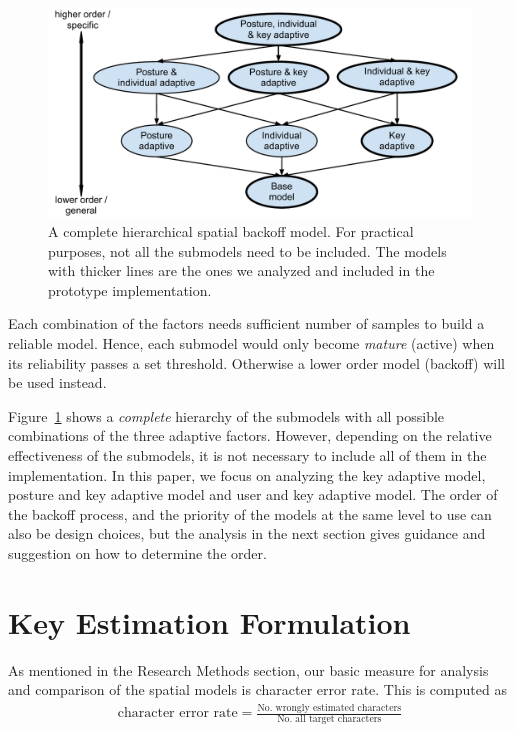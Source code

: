\documentclass{sigchi}
\begin{document}
\begin{figure}[tb]
  \centering
  \includegraphics[width=0.9\columnwidth]{figures/hierarchy.pdf}
  \caption{A complete hierarchical spatial backoff model. For practical purposes, not all the submodels need to be included. The models with thicker lines are the ones we analyzed and included in the prototype implementation.}
  \label{fig:hierarchy}
\end{figure}

Each combination of the factors needs sufficient number of samples to build a reliable model. Hence, each submodel would only become \textit{mature} (active) when its reliability passes a set 
threshold. Otherwise a lower order model (backoff) will be used instead.

Figure~\ref{fig:hierarchy} shows a \textit{complete} hierarchy of the submodels with all
possible combinations of the three adaptive factors. However, depending on the
relative effectiveness of the submodels, it is not necessary to include all of
them in the implementation. In this paper, we focus on analyzing the key
adaptive model, posture and key adaptive model and user and key adaptive model.
The order of the
backoff process, and the priority of the models at the same level to use can
also be design choices, but the analysis in the next section gives
guidance and suggestion on how to determine the order.

\section{Key Estimation Formulation} 
As mentioned in the Research Methods section, our basic measure for analysis and comparison of the spatial models is character error rate. This is computed as
\begin{align}
\text{character error rate} = \frac{\text{No. wrongly estimated characters}}{\text{No. all target characters}}
\end{align}
\end{document}
